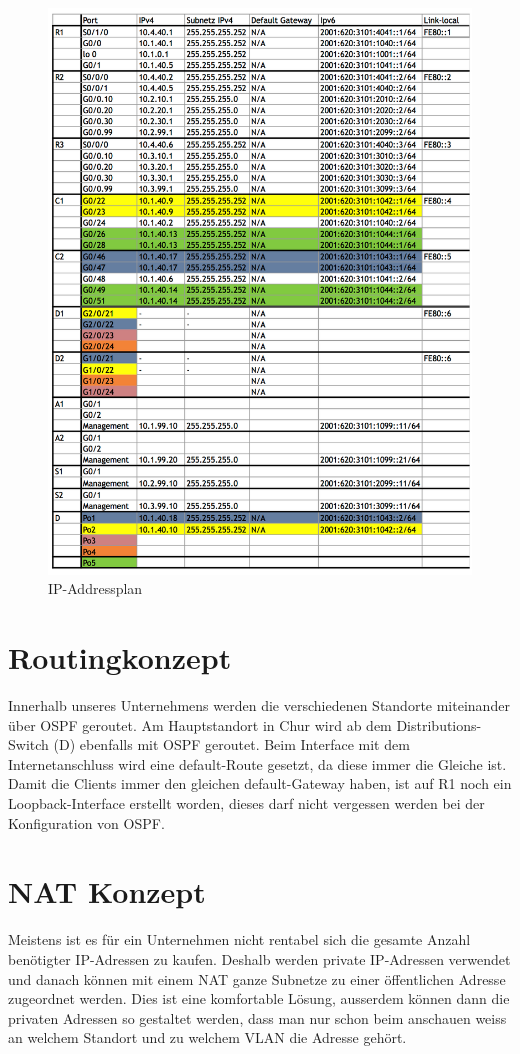 \documentclass[11pt,a4paper]{scrreprt}
\begin{document}
\begin{figure} [H]
\centering
\includegraphics[angle=0,scale=0.4]{Iuk_III_U_addressplan.png}
\caption{IP-Addressplan}
\label{abb: IP-Addressplan}
\end{figure}


\section{Routingkonzept} 
Innerhalb unseres Unternehmens werden die verschiedenen Standorte miteinander über OSPF geroutet. Am Hauptstandort in Chur wird ab dem Distributions-Switch (D) ebenfalls mit OSPF geroutet. Beim Interface mit dem Internetanschluss wird eine default-Route gesetzt, da diese immer die Gleiche ist. Damit die Clients immer den gleichen default-Gateway haben, ist auf R1 noch ein Loopback-Interface erstellt worden, dieses darf nicht vergessen werden bei der Konfiguration von OSPF.

\section{NAT Konzept}
Meistens ist es für ein Unternehmen nicht rentabel sich die gesamte Anzahl benötigter IP-Adressen zu  kaufen. Deshalb werden private IP-Adressen verwendet und danach können mit einem \acs{NAT} ganze Subnetze zu einer öffentlichen Adresse zugeordnet werden. Dies ist eine komfortable Lösung, ausserdem können dann die privaten Adressen so gestaltet werden, dass man nur schon beim anschauen weiss an welchem Standort und zu welchem \acs{VLAN} die Adresse gehört.
\end{document}
